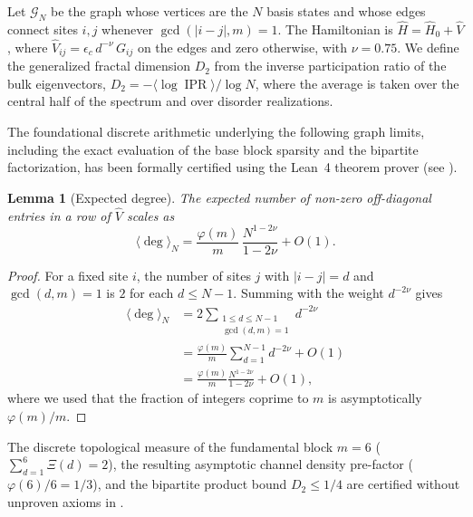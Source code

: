 \documentclass[11pt,a4paper]{article}
\newtheorem{lemma}[theorem]{Lemma}
\DeclareMathOperator{\IPR}{IPR}
\begin{document}
Let $\mathcal{G}_N$ be the graph whose vertices are the $N$ basis states and whose edges connect sites $i,j$ whenever $\gcd(|i-j|,m)=1$. The Hamiltonian is $\hat H = \hat H_0 + \hat V$, where $\hat V_{ij} = \epsilon_c \, d^{-\nu} \, G_{ij}$ on the edges and zero otherwise, with $\nu=0.75$. We define the generalized fractal dimension $D_2$ from the inverse participation ratio of the bulk eigenvectors, $D_2 = -\langle\log \IPR\rangle / \log N$, where the average is taken over the central half of the spectrum and over disorder realizations.

The foundational discrete arithmetic underlying the following graph limits, including the exact evaluation of the base block sparsity and the bipartite factorization, has been formally certified using the Lean~4 theorem prover (see ).

\begin{lemma}[Expected degree]\label{lem:degree}
The expected number of non-zero off-diagonal entries in a row of $\hat V$ scales as
\begin{equation}
\langle \deg \rangle_N = \frac{\varphi(m)}{m} \, \frac{N^{1-2\nu}}{1-2\nu} + O(1).
\end{equation}
\end{lemma}
\begin{proof}
For a fixed site $i$, the number of sites $j$ with $|i-j|=d$ and $\gcd(d,m)=1$ is $2$ for each $d\le N-1$. Summing with the weight $d^{-2\nu}$ gives
\begin{align*}
\langle \deg \rangle_N &= 2\sum_{\substack{1\le d\le N-1 \\ \gcd(d,m)=1}} d^{-2\nu} \\
&= \frac{\varphi(m)}{m} \sum_{d=1}^{N-1} d^{-2\nu} + O(1) \\
&= \frac{\varphi(m)}{m} \frac{N^{1-2\nu}}{1-2\nu} + O(1),
\end{align*}
where we used that the fraction of integers coprime to $m$ is asymptotically $\varphi(m)/m$.
\end{proof}

The discrete topological measure of the fundamental block $m=6$ ($\sum_{d=1}^6 \Xi(d) = 2$),
the resulting asymptotic channel density pre-factor ($\varphi(6)/6 = 1/3$), and the bipartite product bound $D_2 \le 1/4$ 
are certified without unproven axioms in .
\end{document}
